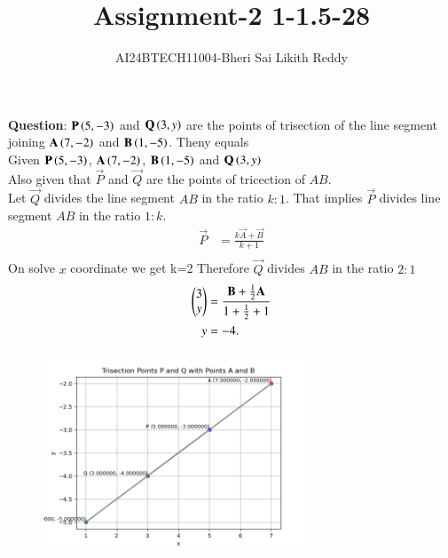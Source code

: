 \documentclass[journal]{IEEEtran}
\begin{document}

\onecolumn
\newpage
\title{Assignment-2  1-1.5-28}
\author{AI24BTECH11004-Bheri Sai Likith Reddy}
\maketitle
\textbf{Question}:
 $\mathbf{P}\left(5,-3\right)$ and $\mathbf{Q}\left(3,y\right)$ are the points of trisection of the line segment joining $\mathbf{A}\left(7,-2\right)$ and $\mathbf{B}\left(1,-5\right)$. Theny equals\\
\solution Given $\mathbf{P}\left(5,-3\right)$, $\mathbf{A}\left(7,-2\right)$, $\mathbf{B}\left(1,-5\right)$ and $\mathbf{Q}\left(3,y\right)$\\
Also given that $\vec{P}$ and $\vec{Q} $ are the points of tricection of $AB$.\\
Let $\vec{Q}$ divides the line segment $AB$ in the ratio $k:1$.
That implies $\vec{P}$ divides line segment $AB$ in the ratio $1:k$.
\begin{align*}
	\vec{P}&= \frac{k\vec{A} +\vec{B}}{k+1}\\
\end{align*}
On solve $x$ coordinate we get k=2
Therefore $\vec{Q}$ divides $AB$ in the ratio $2:1$\\
\begin{align*}
	\begin{pmatrix}3\\ y\end{pmatrix}&=\frac{\mathbf{B} +\frac{1}{2}\mathbf{A} }{1+\frac{1}{2}+1 }\\
	y&=-4.
\end{align*}
\begin{table}[h!]
	\centering
	
\end{table}
\begin{figure}[h!]
    \centering
    \includegraphics[width=0.7\textwidth]{figs/figasgn2.png}
\end{figure}
\end{document}
